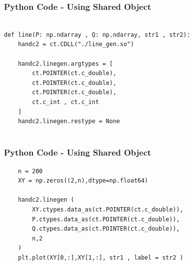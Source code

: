 \documentclass{beamer}
\begin{document}
\begin{frame}[fragile]
    \frametitle{Python Code - Using Shared Object}
    \begin{lstlisting}

def line(P: np.ndarray , Q: np.ndarray, str1 , str2):
    handc2 = ct.CDLL("./line_gen.so")

    handc2.linegen.argtypes = [
        ct.POINTER(ct.c_double),
        ct.POINTER(ct.c_double),
        ct.POINTER(ct.c_double),
        ct.c_int , ct.c_int
    ]
    handc2.linegen.restype = None
    
\end{lstlisting}
\end{frame}
\begin{frame}[fragile]
    \frametitle{Python Code - Using Shared Object}
    \begin{lstlisting}
    n = 200
    XY = np.zeros((2,n),dtype=np.float64)

    handc2.linegen (
        XY.ctypes.data_as(ct.POINTER(ct.c_double)),
        P.ctypes.data_as(ct.POINTER(ct.c_double)),
        Q.ctypes.data_as(ct.POINTER(ct.c_double)),
        n,2
    )
    plt.plot(XY[0,:],XY[1,:], str1 , label = str2 )
    \end{lstlisting}
\end{frame}
\end{document}
